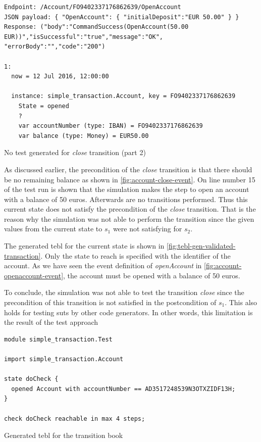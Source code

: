 \begin{sourcecode}[h!]
\begin{lstlisting}[]
Endpoint: /Account/FO9402337176862639/OpenAccount
JSON payload: { "OpenAccount": { "initialDeposit":"EUR 50.00" } }
Response: ("body":"CommandSuccess(OpenAccount(50.00 EUR))","isSuccessful":"true","message":"OK",
"errorBody":"","code":"200")

1:
  now = 12 Jul 2016, 12:00:00

  instance: simple_transaction.Account, key = FO9402337176862639
    State = opened
    ?
    var accountNumber (type: IBAN) = FO9402337176862639
    var balance (type: Money) = EUR50.00
\end{lstlisting}
\caption{No test generated for \textit{close} transition (part 2)}\label{fig:result-codegenakka-close-p2}
\end{sourcecode}
\FloatBarrier

As discussed earlier, the precondition of the \textit{close} transition is that there
should be no remaining balance as shown in \autoref{fig:account-close-event}.
On line number 15 of the test run is shown that the simulation makes the step to
open an account with a balance of 50 euros. Afterwards are no transitions
performed. Thus this current state does not satisfy the precondition of the
\textit{close} transition. That is the reason why the simulation was not able to perform the
transition since the given values from the current state to $s_{1}$ were not
satisfying for $s_{2}$.

The generated tebl for the current state is shown in
\autoref{fig:tebl-gen-validated-transaction}. Only the state to reach is
specified with the identifier of the account. As we have seen the event definition
of \textit{openAccount} in \autoref{fig:account-openaccount-event}, the account
must be opened with a balance of 50 euros.

To conclude, the simulation was not able to test the transition \textit{close} since the
precondition of this transition is not satisfied in the postcondition of $s_{1}$.
This also holds for testing \gls{sut}s by other code generators. In other
words, this limitation is the result of the test approach

\begin{sourcecode}[h!]
\begin{lstlisting}[]
module simple_transaction.Test

import simple_transaction.Account

state doCheck {
  opened Account with accountNumber == AD3517248539N3OTXZIDF13H;
}

check doCheck reachable in max 4 steps;
\end{lstlisting}
\caption{Generated tebl for the transition book}\label{fig:tebl-gen-validated-transaction}
\end{sourcecode}
\FloatBarrier

